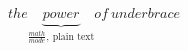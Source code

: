 \documentclass{article}
\begin{document}
    \[ 
        the 
        \underbrace{power}_{\frac{math}{mode},\ \text{plain text}}
        of\ underbrace
    \]
\end{document}
